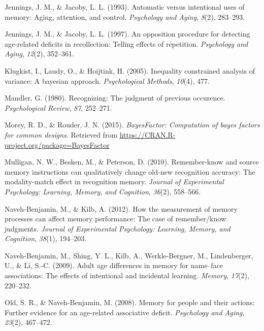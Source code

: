 \documentclass[english,,man]{apa6}
\begin{document}
\leavevmode\hypertarget{ref-Jennings:Jacoby:1993}{}%
Jennings, J. M., \& Jacoby, L. L. (1993). Automatic versus intentional uses of memory: Aging, attention, and control. \emph{Psychology and Aging}, \emph{8}(2), 283--293.

\leavevmode\hypertarget{ref-Jennings:Jacoby:1997}{}%
Jennings, J. M., \& Jacoby, L. L. (1997). An opposition procedure for detecting age-related deficits in recollection: Telling effects of repetition. \emph{Psychology and Aging}, \emph{12}(2), 352--361.

\leavevmode\hypertarget{ref-Klugkist:etal:2005}{}%
Klugkist, I., Laudy, O., \& Hoijtink, H. (2005). Inequality constrained analysis of variance: A bayesian approach. \emph{Psychological Methods}, \emph{10}(4), 477.

\leavevmode\hypertarget{ref-Mandler:1980}{}%
Mandler, G. (1980). Recognizing: The judgment of previous occurence. \emph{Psychological Review}, \emph{87}, 252--271.

\leavevmode\hypertarget{ref-R-BayesFactor}{}%
Morey, R. D., \& Rouder, J. N. (2015). \emph{BayesFactor: Computation of bayes factors for common designs}. Retrieved from \url{https://CRAN.R-project.org/package=BayesFactor}

\leavevmode\hypertarget{ref-Mulligan:etal:2010}{}%
Mulligan, N. W., Besken, M., \& Peterson, D. (2010). Remember-know and source memory instructions can qualitatively change old-new recognition accuracy: The modality-match effect in recognition memory. \emph{Journal of Experimental Psychology: Learning, Memory, and Cognition}, \emph{36}(2), 558--566.

\leavevmode\hypertarget{ref-naveh2012}{}%
Naveh-Benjamin, M., \& Kilb, A. (2012). How the measurement of memory processes can affect memory performance: The case of remember/know judgments. \emph{Journal of Experimental Psychology: Learning, Memory, and Cognition}, \emph{38}(1), 194--203.

\leavevmode\hypertarget{ref-naveh2009}{}%
Naveh-Benjamin, M., Shing, Y. L., Kilb, A., Werkle-Bergner, M., Lindenberger, U., \& Li, S.-C. (2009). Adult age differences in memory for name--face associations: The effects of intentional and incidental learning. \emph{Memory}, \emph{17}(2), 220--232.

\leavevmode\hypertarget{ref-Old2008}{}%
Old, S. R., \& Naveh-Benjamin, M. (2008). Memory for people and their actions: Further evidence for an age-related associative deficit. \emph{Psychology and Aging}, \emph{23}(2), 467--472.
\end{document}
